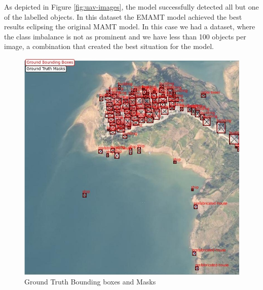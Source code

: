 As depicted in Figure \ref{fig:uav-images}, the model successfully detected all but one of the labelled objects. In this dataset the EMAMT model achieved the best 
results eclipsing the original MAMT model. In this case we had a dataset, where the class imbalance is not as prominent and we have less than 100 objects per image, 
a combination that created the best situation for the model. 


\begin{figure}[!h]
    \captionsetup{justification=centering}
    \centering
    \begin{minipage}{0.4\textwidth}
      \includegraphics[scale=0.35]{Figures/uav_ground_truth.jpg}
      \caption{Ground Truth Bounding boxes and Masks}
    \end{minipage}
    \hfill
    \begin{minipage}{0.4\textwidth}

\end{minipage}
\end{figure}
